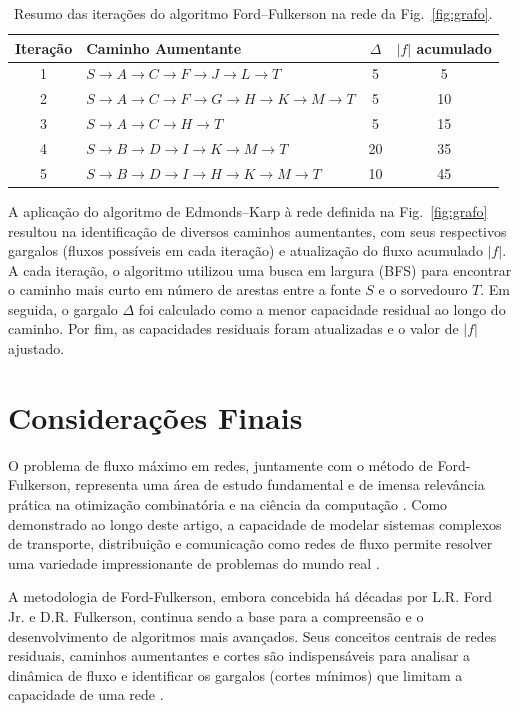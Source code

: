 \documentclass[12pt]{article}
\begin{document}
\begin{table}[H]
\centering
\caption{Resumo das iterações do algoritmo Ford–Fulkerson na rede da Fig.~\ref{fig:grafo}.}
\begin{tabular}{|c|l|c|c|}
\hline
Iteração & Caminho Aumentante & $\Delta$ & $|f|$ acumulado \\
\hline
1 & $S\to A\to C\to F\to J\to L\to T$ & 5 & 5 \\
2 & $S\to A\to C\to F\to G\to H\to K\to M\to T$ & 5 & 10 \\
3 & $S\to A\to C\to H\to T$ & 5 & 15 \\
4 & $S\to B\to D\to I\to K\to M\to T$ & 20 & 35 \\
5 & $S\to B\to D\to I\to H\to K\to M\to T$ & 10 & 45 \\
\hline
\end{tabular}
\end{table}

A aplicação do algoritmo de Edmonds--Karp à rede definida na Fig.~\ref{fig:grafo} resultou na identificação de diversos caminhos aumentantes, com seus respectivos gargalos (fluxos possíveis em cada iteração) e atualização do fluxo acumulado $\lvert f \rvert$. A cada iteração, o algoritmo utilizou uma busca em largura (BFS) para encontrar o caminho mais curto em número de arestas entre a fonte $S$ e o sorvedouro $T$. Em seguida, o gargalo $\Delta$ foi calculado como a menor capacidade residual ao longo do caminho. Por fim, as capacidades residuais foram atualizadas e o valor de $\lvert f \rvert$ ajustado.

\newpage
\section{Considerações Finais}

O problema de fluxo máximo em redes, juntamente com o método de Ford-Fulkerson, representa uma área de estudo fundamental e de imensa relevância prática na otimização combinatória e na ciência da computação \cite{ford1956}. Como demonstrado ao longo deste artigo, a capacidade de modelar sistemas complexos de transporte, distribuição e comunicação como redes de fluxo permite resolver uma variedade impressionante de problemas do mundo real \cite{ahuja1993}.

\noindent A metodologia de Ford-Fulkerson, embora concebida há décadas por L.R. Ford Jr. e D.R. Fulkerson, continua sendo a base para a compreensão e o desenvolvimento de algoritmos mais avançados. Seus conceitos centrais de redes residuais, caminhos aumentantes e cortes são indispensáveis para analisar a dinâmica de fluxo e identificar os gargalos (cortes mínimos) que limitam a capacidade de uma rede \cite{cormen2009}.
\end{document}
